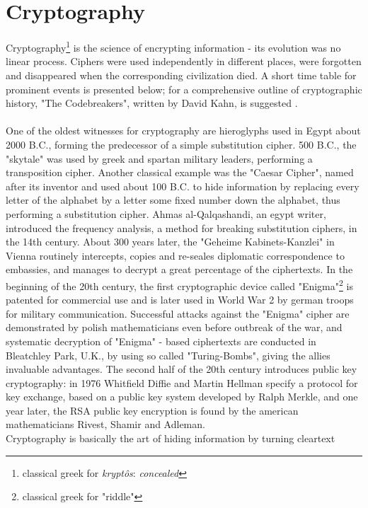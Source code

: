 \section{Cryptography}\label{sec:crypto}
Cryptography\footnote{classical greek for \textit{krypt\^{o}s}: \textit{concealed}}
is the science of encrypting information - its evolution was no linear process. Ciphers were used independently in different
places, were forgotten and disappeared when the corresponding civilization died.
A short time table for prominent events is presented below; for a comprehensive outline of cryptographic history, "The Codebreakers", written by David Kahn,
is suggested \cite{codebreakers}.
\\
\\
One of the oldest witnesses for cryptography are hieroglyphs used in Egypt about 2000 B.C., forming the predecessor
of a simple substitution cipher. 500 B.C., the "skytale" was used by greek and spartan military leaders, performing a transposition cipher. Another classical
example was the "Caesar Cipher", named after its inventor and used about 100 B.C. to hide information by replacing every letter of the alphabet by a letter some fixed number down the alphabet,
thus performing a substitution cipher. Ahmas al-Qalqashandi, an egypt writer, introduced the frequency analysis, a method for breaking substitution ciphers,
in the 14th century. About 300 years later, the "Geheime Kabinets-Kanzlei" in Vienna routinely intercepts, copies and 
 re-seales diplomatic correspondence to embassies, and manages to decrypt a great percentage of the ciphertexts. In the beginning of the 20th century, the 
 first cryptographic device called "Enigma"\footnote{classical greek for "riddle"} is patented for commercial use and is later used in World War 2 by german troops for 
 military communication. Successful attacks against the "Enigma" cipher are demonstrated by polish mathematicians even before outbreak of the war, and systematic
 decryption of "Enigma" - based ciphertexts are conducted in Bleatchley Park, U.K., by using so called "Turing-Bombs", giving the allies invaluable advantages.
The second half of the 20th century introduces public key cryptography: in 1976 Whitfield Diffie and Martin Hellman specify a 
protocol for key exchange, based on a public key system developed by Ralph Merkle, and one year later, the RSA public key encryption is found by the american
mathematicians Rivest, Shamir and Adleman.
\\
Cryptography is basically the art of hiding information by turning cleartext
